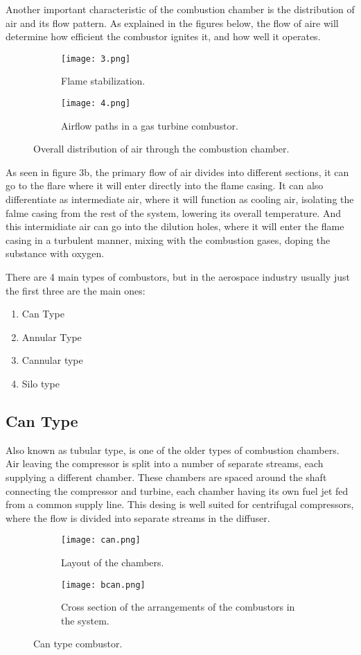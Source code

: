 \documentclass[12pt, letterpaper]{article}
\begin{document}
Another important characteristic of the combustion chamber is the distribution of air and its flow pattern. As explained in the figures below, the flow of aire will determine how efficient the combustor ignites it, and how well it operates.

\begin{figure}[H]
	\centering
	\begin{subfigure}[b]{0.49\linewidth}
		\texttt{[image: 3.png]}
		\caption{Flame stabilization.}
	\end{subfigure}
	\begin{subfigure}[b]{0.49\linewidth}
		\texttt{[image: 4.png]}
		\caption{Airflow paths in a gas turbine combustor.}
	\end{subfigure}
	\caption{Overall distribution of air through the combustion chamber.}
\end{figure}

As seen in figure 3b, the primary flow of air divides into different sections, it can go to the flare where it will enter directly into the flame casing. It can also differentiate as intermediate air, where it will function as cooling air, isolating the falme casing from the rest of the system, lowering its overall temperature. And this intermidiate air can go into the dilution holes, where it will enter the flame casing in a turbulent manner, mixing with the combustion gases, doping the substance with oxygen.

There are 4 main types of combustors, but in the aerospace industry usually just the first three are the main ones:
\begin{enumerate}
	\item Can Type
	\item Annular Type
	\item Cannular type
	\item Silo type
\end{enumerate}

\subsection*{Can Type}
Also known as tubular type, is one of the older types of combustion chambers. Air leaving the compressor is split into a number of separate streams, each supplying a different chamber. These chambers are spaced around the shaft connecting the compressor and turbine, each chamber having its own fuel jet fed from a common supply line. This desing is well suited for centrifugal compressors, where the flow is divided into separate streams in the diffuser.
\begin{figure}[H]
	\centering
	\begin{subfigure}[b]{0.49\linewidth}
		\texttt{[image: can.png]}
		\caption{Layout of the chambers.}
	\end{subfigure}
	\begin{subfigure}[b]{0.49\linewidth}
		\texttt{[image: bcan.png]}
		\caption{Cross section of the arrangements of the combustors in the system.}
	\end{subfigure}
	\caption{Can type combustor.}
\end{figure}
\end{document}
